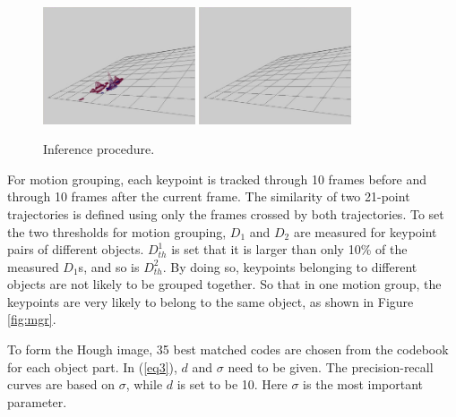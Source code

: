 \begin{figure}
\includegraphics[width=0.4\textwidth,bb=0 0 760 585]{inf7.jpg}
\includegraphics[width=0.4\textwidth,bb=0 0 760 585]{inf8.jpg}\\
\caption[Inference procedure]{Inference procedure.}
\label{fig:inf}
\end{figure}

For motion grouping, each keypoint is tracked through 10 frames before and through 10 frames after the current frame. The similarity of two 21-point trajectories is defined using only  the frames crossed by both trajectories. To set the two thresholds for motion grouping, $D_1$ and $D_2$ are  measured for keypoint pairs of different objects. $D^1_{th}$ is set that it is larger than only 10\% of the measured $D_1$s, and so is $D^2_{th}$. By doing so, keypoints belonging to different objects are not likely to be grouped together. So that in one motion group, the keypoints are very likely to belong to the same object, as shown in Figure \ref{fig:mgr}.

To form the Hough image, 35 best matched codes are chosen from the codebook for each object part. In (\ref{eq3}), $d$ and $\sigma$ need to be given. The precision-recall curves are based on $\sigma$, while $d$ is set to be 10. Here $\sigma$ is the most important parameter.

